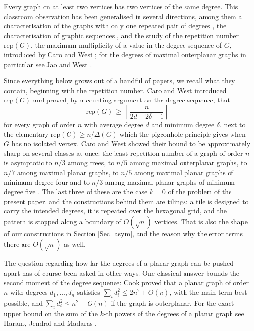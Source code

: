 \documentclass[10pt,a4paper]{article}
\begin{document}
Every graph on at least two vertices has two vertices of the same degree. This classroom observation
has been generalised in several directions, among them a characterisation of the graphs with only one repeated pair of
degrees \cite{BehzadChartrand}, the characterisation of graphic sequences
\cite{ErdosGallai, Hakimi, Havel}, and the study of the repetition number $\mathrm{rep}(G)$, the
maximum multiplicity of a value in the degree sequence of $G$, introduced by Caro and West
\cite{CaroWest}; for the degrees of maximal outerplanar graphs in particular see Jao and West
\cite{JaoWest}.

Since everything below grows out of a handful of papers, we recall what they contain, beginning with
the repetition number. Caro and West \cite{CaroWest} introduced $\mathrm{rep}(G)$ and proved, by a
counting argument on the degree sequence, that
\[
\mathrm{rep}(G)\ \geq \ \left\lceil \frac{n}{2d-2\delta +1}\right\rceil
\]
for every graph of order $n$ with average degree $d$ and minimum degree $\delta $, next to the
elementary $\mathrm{rep}(G)\geq n/\Delta (G)$ which the pigeonhole principle gives when $G$ has no
isolated vertex.  Caro and West showed
their bound to be approximately sharp on several classes at once: the least repetition number of a
graph of order $n$ is asymptotic to $n/3$ among trees, to $n/5$ among maximal outerplanar graphs, to
$n/7$ among maximal planar graphs, to $n/5$ among maximal planar graphs of minimum degree four and to
$n/3$ among maximal planar graphs of minimum degree five \cite[Theorem 2.5]{CaroWest}. The last three of
these are the case $k=0$ of the problem of the present paper, and the constructions behind them are
tilings: a tile is designed to carry the intended degrees, it is repeated over the hexagonal grid, and
the pattern is stopped along a boundary of $O(\sqrt{n})$ vertices. That is also the shape of our
constructions in Section \ref{Sec_asym}, and the reason why the error terms there are $O(\sqrt{n})$ as
well.

The question regarding how far the degrees of a planar graph can be pushed apart has of course been asked in
other ways. One classical answer bounds the second moment of the degree sequence: Cook \cite{Cook}
proved that a planar graph of order $n$ with degrees $d_{1},\ldots ,d_{n}$ satisfies
$\sum_{i}d_{i}^{2}\leq 2n^{2}+O(n)$, with the main term best possible, and $\sum_{i}d_{i}^{2}\leq
n^{2}+O(n)$ if the graph is outerplanar. For the exact upper bound on the sum of the $k$-th powers of the degrees of a planar graph see Harant,
Jendro\v{l} and Madaras \cite{HarantJendrolMadaras}. 
\end{document}
